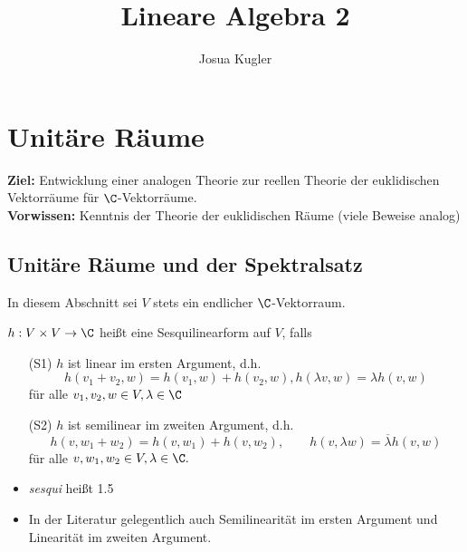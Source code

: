 \documentclass{article}
\title{Lineare Algebra 2}
\author{Josua Kugler}
\begin{document}
    \section{Unitäre Räume}
    \textbf{Ziel:} Entwicklung einer analogen Theorie zur reellen Theorie der euklidischen Vektorräume für $\C$-Vektorräume.\\
    \textbf{Vorwissen:} Kenntnis der Theorie der euklidischen Räume (viele Beweise analog)
    \subsection{Unitäre Räume und der Spektralsatz}
    \begin{notatio}
        In diesem Abschnitt sei $V$ stets ein endlicher $\C$-Vektorraum.
    \end{notatio}
    \begin{definition}
        $h: V\times V \to \C$ heißt eine Sesquilinearform auf $V$, falls
        \begin{itemize}
            \item[(S1)] $h$ ist linear im ersten Argument, d.h.
            $$h(v_1 + v_2, w) = h(v_1, w) + h(v_2, w), h(\lambda v, w) = \lambda h(v,w)$$ für alle $v_1, v_2, w \in V, \lambda \in \C$
            \item[(S2)] $h$ ist semilinear im zweiten Argument, d.h.
            $$ h(v, w_1 + w_2) = h(v, w_1) + h(v, w_2),\qquad
            h(v, \lambda w) = \overline{\lambda} h(v, w)$$ für alle $v, w_1, w_2\in V, \lambda \in \C.$
        \end{itemize}
    \end{definition}
    \begin{anmerkung}
        \begin{itemize}
            \item \textit{sesqui} heißt 1.5
            \item In der Literatur gelegentlich auch Semilinearität im ersten Argument und Linearität im zweiten Argument.
        \end{itemize}
    \end{anmerkung} 
\end{document}
